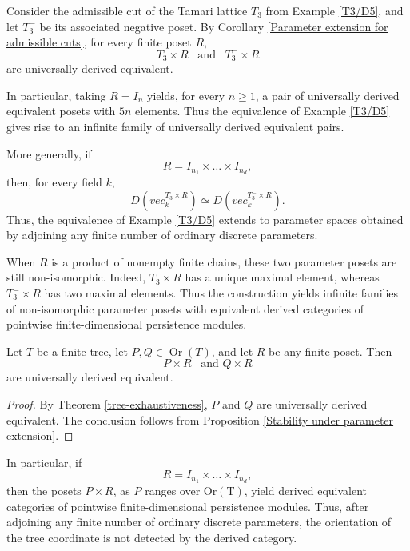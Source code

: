 \begin{example} \label{example Tamari TDA}
    Consider the admissible cut of the Tamari lattice $T_3$ from Example \ref{T3/D5}, and let $T_3^-$ be its associated negative poset. By Corollary \ref{Parameter extension for admissible cuts}, for every finite poset $R$,
    \[T_3 \times R \,\,\, \text{ and } \,\,\, T_3^- \times R\] are universally derived equivalent.

    In particular, taking $R=I_n$ yields, for every $n \geq 1$, a pair of universally derived equivalent posets with $5n$ elements. Thus the equivalence of Example \ref{T3/D5} gives rise to an infinite family of universally derived equivalent pairs. 

    More generally, if
    \[R=I_{n_1} \times \dots \times I_{n_d},\] then, for every field $k$,
    \[D(vec_k^{T_3 \times R}) \simeq D(vec_k^{T_3^- \times R}).\] Thus, the equivalence of Example \ref{T3/D5} extends to parameter spaces obtained by adjoining any finite number of ordinary discrete parameters.

    When $R$ is a product of nonempty finite chains, these two parameter posets are still non-isomorphic. Indeed, $T_3 \times R$ has a unique maximal element, whereas $T_3^- \times R$ has two maximal elements. Thus the construction yields infinite families of non-isomorphic parameter posets with equivalent derived categories of pointwise finite-dimensional persistence modules.
\end{example}

\begin{corollary}%
\label{Parameter extension for tree orientation}
    Let $T$ be a finite tree, let $P,Q \in \operatorname{Or}(T)$, and let $R$ be any finite poset. Then
    \[P \times R \,\,\, \text{ and } Q \times R\] are universally derived equivalent.
\end{corollary}

\begin{proof}
    By Theorem \ref{tree-exhaustiveness}, $P$ and $Q$ are universally derived equivalent. The conclusion follows from Proposition \ref{Stability under parameter extension}.
\end{proof}


In particular, if
\[R=I_{n_1} \times \dots \times I_{n_d},\] then the posets $P \times R$, as $P$ ranges over $\operatorname{Or(T)}$, yield derived equivalent categories of pointwise finite-dimensional persistence modules. Thus, after adjoining any finite number of ordinary discrete parameters, the orientation of the tree coordinate is not detected by the derived category.

